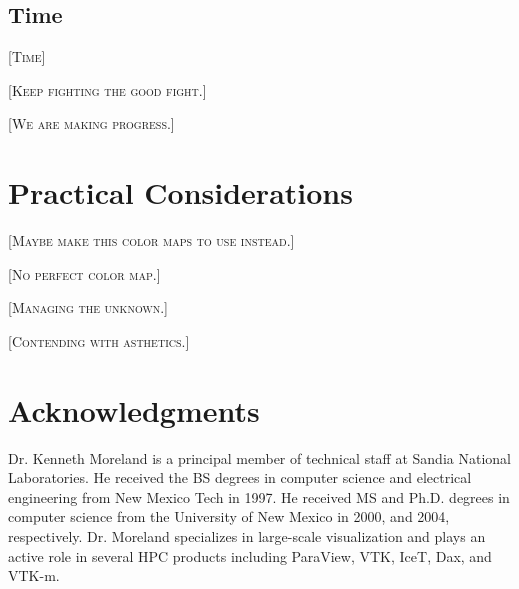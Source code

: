 \documentclass[letterpaper,twocolumn,fleqn]{article}
\newcommand{\fix}[1]{{\color{red}\textsc{[#1]}}}
\begin{document}
\subsection{Time}

\fix{Time}

\fix{Keep fighting the good fight.}

\fix{We are making progress.}


\section{Practical Considerations}

\fix{Maybe make this color maps to use instead.}

\fix{No perfect color map.}

\fix{Managing the unknown.}

\fix{Contending with asthetics.}


\section{Acknowledgments} 


\small


\begin{biography}
\noindent
Dr. Kenneth Moreland is a principal member of technical staff at Sandia
National Laboratories. He received the BS degrees in computer science and
electrical engineering from New Mexico Tech in 1997. He received MS and
Ph.D. degrees in computer science from the University of New Mexico in
2000, and 2004, respectively. Dr. Moreland specializes in large-scale
visualization and plays an active role in several HPC products including
ParaView, VTK, IceT, Dax, and VTK-m.
\end{biography}
\end{document}
